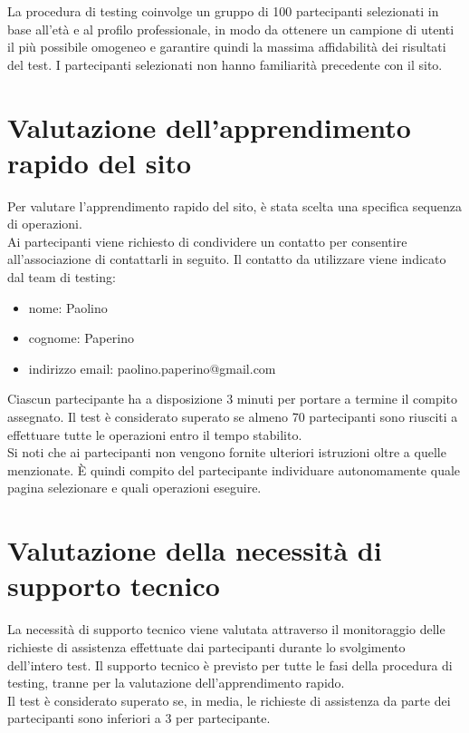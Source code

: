 \documentclass{article}
\begin{document}
\noindent La procedura di testing coinvolge un gruppo di 100 partecipanti selezionati in base all'età e al profilo professionale, in modo da ottenere un campione di utenti il più possibile omogeneo e garantire quindi la massima affidabilità dei risultati del test. I partecipanti selezionati non hanno familiarità precedente con il sito.

\vspace{0.7cm}

\section{Valutazione dell'apprendimento rapido del sito}
Per valutare l'apprendimento rapido del sito, è stata scelta una specifica sequenza di operazioni.\\
Ai partecipanti viene richiesto di condividere un contatto per consentire all'associazione di contattarli in seguito. Il contatto da utilizzare viene indicato dal team di testing:
\begin{itemize}
    \item nome: Paolino
    \item cognome: Paperino
    \item indirizzo email: paolino.paperino@gmail.com
\end{itemize}
Ciascun partecipante ha a disposizione 3 minuti per portare a termine il compito assegnato. Il test è considerato superato se almeno 70 partecipanti sono riusciti a effettuare tutte le operazioni entro il tempo stabilito.\\
Si noti che ai partecipanti non vengono fornite ulteriori istruzioni oltre a quelle menzionate. È quindi compito del partecipante individuare autonomamente quale pagina selezionare e quali operazioni eseguire.

\vspace{0.7cm}

\section{Valutazione della necessità di supporto tecnico}
La necessità di supporto tecnico viene valutata attraverso il monitoraggio delle richieste di assistenza effettuate dai partecipanti durante lo svolgimento dell'intero test. Il supporto tecnico è previsto per tutte le fasi della procedura di testing, tranne per la valutazione dell'apprendimento rapido.\\
Il test è considerato superato se, in media, le richieste di assistenza da parte dei partecipanti sono inferiori a 3 per partecipante.
\end{document}
